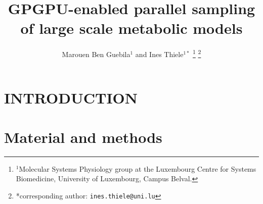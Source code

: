 \documentclass[letterpaper, 10 pt, conference]{ieeeconf}  %
\title{\LARGE \bf
GPGPU-enabled parallel sampling of large scale metabolic models
}
\author{Marouen Ben Guebila$^{1}$ and Ines Thiele$^{1*}$%
\thanks{$^{1}$Molecular Systems Physiology group at the Luxembourg Centre for Systems Biomedicine,
        University of Luxembourg, Campus Belval.
        }%
\thanks{*corresponding author: {\tt\small ines.thiele@uni.lu}}
}
\begin{document}
\maketitle
\thispagestyle{empty}
\pagestyle{empty}


\begin{abstract}



\end{abstract}


\section{INTRODUCTION}




\addtolength{\textheight}{-12cm}   %








\section{Material and methods}
\end{document}
